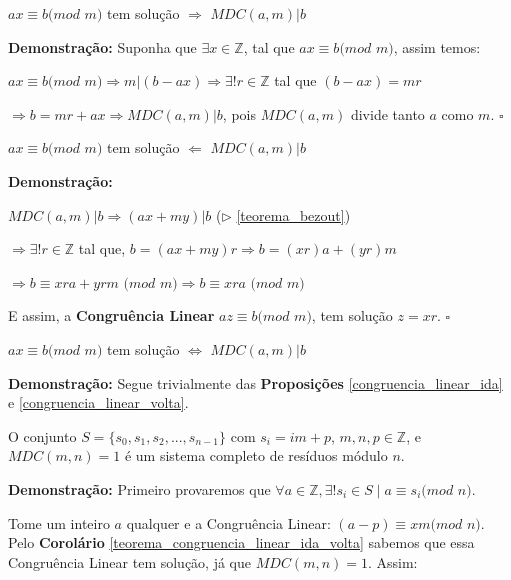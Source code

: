 \begin{proposition}\label{congruencia_linear_ida}
$ax \equiv b (mod$ $m)$ tem solução $\Rightarrow$ $MDC(a,m)|b$
\end{proposition}
\textbf{Demonstração:}
Suponha que $\exists x\in\mathbb{Z}$, tal que $ax\equiv b(mod$ $m)$, assim temos:

$ax\equiv b(mod$ $m) \Rightarrow m|(b-ax) \Rightarrow \exists! r\in\mathbb{Z}$ tal que $(b-ax) = mr$

$\Rightarrow b = mr + ax \Rightarrow MDC(a,m)|b$, pois $MDC(a,m)$ divide tanto $a$ como $m$. $\square$
\newline


\begin{proposition}\label{congruencia_linear_volta}
$ax \equiv b (mod$ $m)$ tem solução $\Leftarrow$ $MDC(a,m)|b$
\end{proposition}
\textbf{Demonstração:}

$MDC(a,m)|b \Rightarrow (ax+my)|b$ ($\triangleright$ \autoref{teorema_bezout})

$\Rightarrow \exists!r\in\mathbb{Z}$ tal que, $b=(ax + my)r \Rightarrow b = (xr)a + (yr)m$

$\Rightarrow b \equiv xra + yrm$ $(mod$ $m) \Rightarrow b \equiv xra$ $(mod$ $m)$

E assim, a \textbf{Congruência Linear} $az\equiv b (mod$ $m)$, tem solução $z=xr$. $\square$

\begin{corollary}\label{teorema_congruencia_linear_ida_volta}
$ax \equiv b (mod$ $m)$ tem solução $\Leftrightarrow$ $MDC(a,m)|b$
\end{corollary}
\textbf{Demonstração:}
Segue trivialmente das \textbf{Proposições} \autoref{congruencia_linear_ida} e \autoref{congruencia_linear_volta}.




\begin{theorem}\label{sistemo_completp_residuo}
O conjunto $S = \{s_0, s_1, s_2,..., s_{n-1}\}$ com $s_i = im + p$, $m, n, p \in \mathbb{Z}$, e $MDC(m,n) = 1$ é um sistema completo de resíduos módulo $n$.
\end{theorem}
\textbf{Demonstração:}
Primeiro provaremos que $\forall a \in \mathbb{Z}, \exists! s_i \in S \mid a \equiv s_i (mod$ $n)$.

Tome um inteiro $a$ qualquer e a Congruência Linear: $(a-p)\equiv xm(mod$ $n)$. Pelo \textbf{Corolário} \autoref{teorema_congruencia_linear_ida_volta} sabemos que essa Congruência Linear tem solução, já que $MDC(m,n)=1$. Assim:


